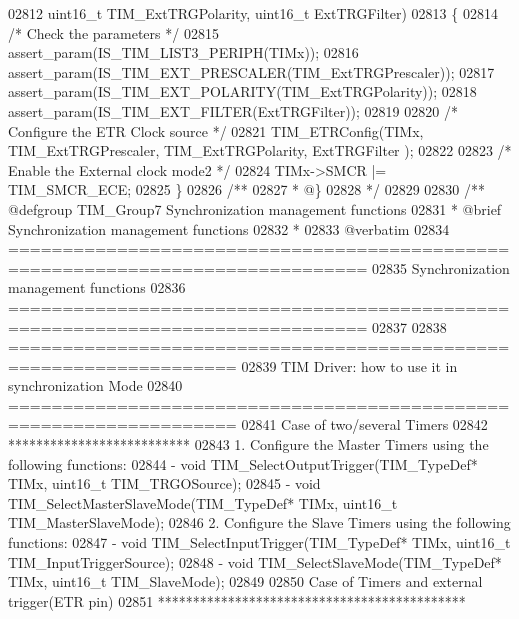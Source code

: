 \begin{DoxyCode}
02812                              uint16\_t TIM\_ExtTRGPolarity, uint16\_t ExtTRGFilter)
02813 \{
02814   \textcolor{comment}{/* Check the parameters */}
02815   assert_param(IS\_TIM\_LIST3\_PERIPH(TIMx));
02816   assert_param(IS\_TIM\_EXT\_PRESCALER(TIM\_ExtTRGPrescaler));
02817   assert_param(IS\_TIM\_EXT\_POLARITY(TIM\_ExtTRGPolarity));
02818   assert_param(IS\_TIM\_EXT\_FILTER(ExtTRGFilter));
02819 
02820   \textcolor{comment}{/* Configure the ETR Clock source */}
02821   TIM_ETRConfig(TIMx, TIM\_ExtTRGPrescaler, TIM\_ExtTRGPolarity, ExtTRGFilter
      );
02822 
02823   \textcolor{comment}{/* Enable the External clock mode2 */}
02824   TIMx->SMCR |= TIM_SMCR_ECE;
02825 \}
02826 \textcolor{comment}{/**}
02827 \textcolor{comment}{  * @\}}
02828 \textcolor{comment}{  */}
02829 
02830 \textcolor{comment}{/** @defgroup TIM\_Group7 Synchronization management functions}
02831 \textcolor{comment}{ *  @brief    Synchronization management functions }
02832 \textcolor{comment}{ *}
02833 \textcolor{comment}{@verbatim   }
02834 \textcolor{comment}{ ===============================================================================}
02835 \textcolor{comment}{                       Synchronization management functions}
02836 \textcolor{comment}{ ===============================================================================  }
02837 \textcolor{comment}{                   }
02838 \textcolor{comment}{       ===================================================================      }
02839 \textcolor{comment}{              TIM Driver: how to use it in synchronization Mode}
02840 \textcolor{comment}{       =================================================================== }
02841 \textcolor{comment}{       Case of two/several Timers}
02842 \textcolor{comment}{       **************************}
02843 \textcolor{comment}{       1. Configure the Master Timers using the following functions:}
02844 \textcolor{comment}{          - void TIM\_SelectOutputTrigger(TIM\_TypeDef* TIMx, uint16\_t TIM\_TRGOSource); }
02845 \textcolor{comment}{          - void TIM\_SelectMasterSlaveMode(TIM\_TypeDef* TIMx, uint16\_t TIM\_MasterSlaveMode);  }
02846 \textcolor{comment}{       2. Configure the Slave Timers using the following functions: }
02847 \textcolor{comment}{          - void TIM\_SelectInputTrigger(TIM\_TypeDef* TIMx, uint16\_t TIM\_InputTriggerSource);  }
02848 \textcolor{comment}{          - void TIM\_SelectSlaveMode(TIM\_TypeDef* TIMx, uint16\_t TIM\_SlaveMode); }
02849 \textcolor{comment}{          }
02850 \textcolor{comment}{       Case of Timers and external trigger(ETR pin)}
02851 \textcolor{comment}{       ********************************************       }

\end{DoxyCode}
